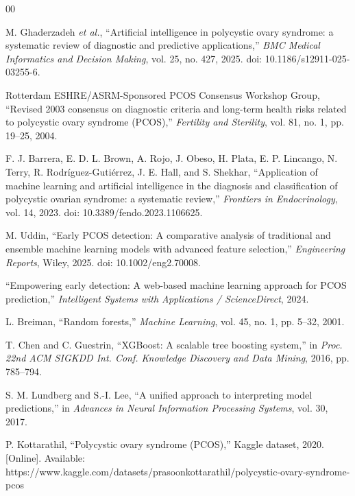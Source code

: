 \documentclass[conference]{IEEEtran}
\begin{document}
\begin{thebibliography}{00}

 M. Ghaderzadeh \emph{et al.}, ``Artificial intelligence in polycystic ovary syndrome: a systematic review of diagnostic and predictive applications,'' \emph{BMC Medical Informatics and Decision Making}, vol. 25, no. 427, 2025. doi: 10.1186/s12911-025-03255-6.

 Rotterdam ESHRE/ASRM-Sponsored PCOS Consensus Workshop Group, ``Revised 2003 consensus on diagnostic criteria and long-term health risks related to polycystic ovary syndrome (PCOS),'' \emph{Fertility and Sterility}, vol. 81, no. 1, pp. 19--25, 2004.

 F. J. Barrera, E. D. L. Brown, A. Rojo, J. Obeso, H. Plata, E. P. Lincango, N. Terry, R. Rodr\'{i}guez-Guti\'{e}rrez, J. E. Hall, and S. Shekhar, ``Application of machine learning and artificial intelligence in the diagnosis and classification of polycystic ovarian syndrome: a systematic review,'' \emph{Frontiers in Endocrinology}, vol. 14, 2023. doi: 10.3389/fendo.2023.1106625.

 M. Uddin, ``Early PCOS detection: A comparative analysis of traditional and ensemble machine learning models with advanced feature selection,'' \emph{Engineering Reports}, Wiley, 2025. doi: 10.1002/eng2.70008.

 ``Empowering early detection: A web-based machine learning approach for PCOS prediction,'' \emph{Intelligent Systems with Applications / ScienceDirect}, 2024.

 L. Breiman, ``Random forests,'' \emph{Machine Learning}, vol. 45, no. 1, pp. 5--32, 2001.

 T. Chen and C. Guestrin, ``XGBoost: A scalable tree boosting system,'' in \emph{Proc. 22nd ACM SIGKDD Int. Conf. Knowledge Discovery and Data Mining}, 2016, pp. 785--794.

 S. M. Lundberg and S.-I. Lee, ``A unified approach to interpreting model predictions,'' in \emph{Advances in Neural Information Processing Systems}, vol. 30, 2017.

 P. Kottarathil, ``Polycystic ovary syndrome (PCOS),'' Kaggle dataset, 2020. [Online]. Available: https://www.kaggle.com/datasets/prasoonkottarathil/polycystic-ovary-syndrome-pcos

\end{thebibliography}
\end{document}

